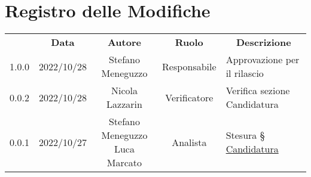 \thispagestyle{empty}

\section*{Registro delle Modifiche}

\begin{center}
    \renewcommand{\arraystretch}{1.8}
    \begin{longtable}[c]{c | c | c | c | p{5cm}}
    \rowcolor[HTML]{444444}
    \multicolumn{1}{c}{\color[HTML]{FFFFFF} \textbf{Versione}} & 
    \multicolumn{1}{c}{\color[HTML]{FFFFFF} \textbf{Data}} & 
    \multicolumn{1}{c}{\color[HTML]{FFFFFF} \textbf{Autore}} & 
    \multicolumn{1}{c}{\color[HTML]{FFFFFF} \textbf{Ruolo}} & 
    \multicolumn{1}{c}{\color[HTML]{FFFFFF} \textbf{Descrizione}} \\

    
    1.0.0 & 2022/10/28 & Stefano Meneguzzo  & Responsabile  & Approvazione per il rilascio \\ \hline
    0.0.2 & 2022/10/28 & Nicola Lazzarin    & Verificatore  & Verifica sezione Candidatura \\ 
    0.0.1 & 2022/10/27 & \makecell{Stefano Meneguzzo\\Luca Marcato}  & Analista      & Stesura § \hyperref[section:candidatura]{Candidatura} \\ 

    \end{longtable}
\end{center}